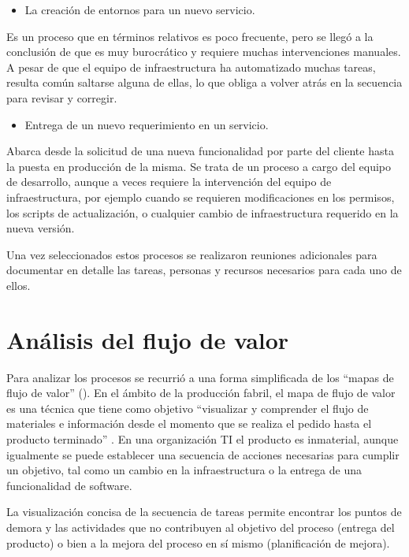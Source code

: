 \begin{itemize}
\item La creación de entornos para un nuevo servicio.
\end{itemize}
Es un proceso que en términos relativos es poco frecuente, pero se
llegó a la conclusión de que es muy burocrático y requiere muchas
intervenciones manuales. A pesar de que el equipo de infraestructura
ha automatizado muchas tareas, resulta común saltarse alguna de ellas,
lo que obliga a volver atrás en la secuencia para revisar y corregir.

\begin{itemize}
\item Entrega de un nuevo requerimiento en un servicio.
\end{itemize}
Abarca desde la solicitud de una nueva funcionalidad por parte del
cliente hasta la puesta en producción de la misma. Se trata de un
proceso a cargo del equipo de desarrollo, aunque a veces requiere la
intervención del equipo de infraestructura, por ejemplo cuando se
requieren modificaciones en los permisos, los scripts de
actualización, o cualquier cambio de infraestructura requerido en la
nueva versión.

Una vez seleccionados estos procesos se realizaron reuniones
adicionales para documentar en detalle las tareas, personas y recursos
necesarios para cada uno de ellos.

\section{Análisis del flujo de valor}

Para analizar los procesos se recurrió a una forma simplificada de los
``mapas de flujo de valor'' (). En el ámbito
de la producción fabril, el mapa de flujo de valor es una técnica
 que tiene como objetivo ``visualizar y comprender el
flujo de materiales e información desde el momento que se realiza el
pedido hasta el producto terminado''
\cite{learningtosee}. En una
organización TI el producto es inmaterial, aunque igualmente se puede
establecer una secuencia de acciones necesarias para cumplir un
objetivo, tal como un cambio en la infraestructura o la entrega de una
funcionalidad de software.

La visualización concisa de la secuencia de tareas permite encontrar
los puntos de demora y las actividades que no contribuyen al objetivo
del proceso (entrega del producto) o bien a la mejora del proceso en
sí mismo (planificación de mejora).

